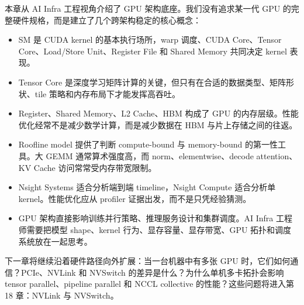 本章从 AI Infra 工程视角介绍了 GPU 架构底座。我们没有追求某一代 GPU 的完整硬件规格，而是建立了几个跨架构稳定的核心概念：

\begin{itemize}
  \item SM 是 CUDA kernel 的基本执行场所，warp 调度、CUDA Core、Tensor Core、Load/Store Unit、Register File 和 Shared Memory 共同决定 kernel 表现。
  \item Tensor Core 是深度学习矩阵计算的关键，但只有在合适的数据类型、矩阵形状、tile 策略和内存布局下才能发挥高吞吐。
  \item Register、Shared Memory、L2 Cache、HBM 构成了 GPU 的内存层级。性能优化经常不是减少数学计算，而是减少数据在 HBM 与片上存储之间的往返。
  \item Roofline model 提供了判断 compute-bound 与 memory-bound 的第一性工具。大 GEMM 通常算术强度高，而 norm、elementwise、decode attention、KV Cache 访问常常受内存带宽限制。
  \item Nsight Systems 适合分析端到端 timeline，Nsight Compute 适合分析单 kernel。性能优化应从 profiler 证据出发，而不是只凭经验猜测。
  \item GPU 架构直接影响训练并行策略、推理服务设计和集群调度。AI Infra 工程师需要把模型 shape、kernel 行为、显存容量、显存带宽、GPU 拓扑和调度系统放在一起思考。
\end{itemize}

下一章将继续沿着硬件路径向外扩展：当一台机器中有多张 GPU 时，它们如何通信？PCIe、NVLink 和 NVSwitch 的差异是什么？为什么单机多卡拓扑会影响 tensor parallel、pipeline parallel 和 NCCL collective 的性能？这些问题将进入第 18 章：NVLink 与 NVSwitch。
